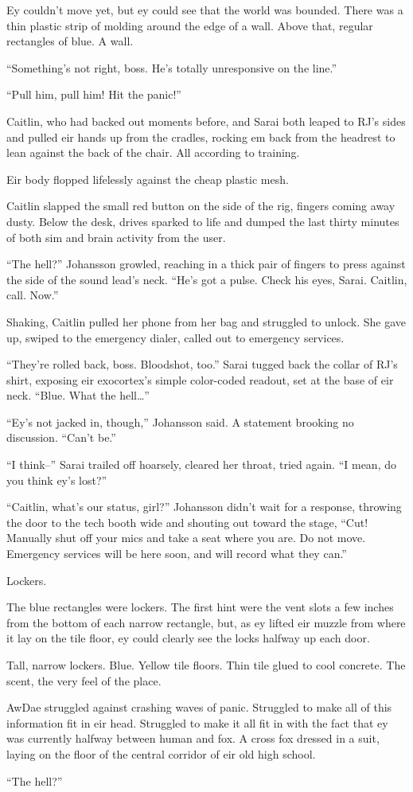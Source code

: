 Ey couldn't move yet, but ey could see that the world was bounded. There was a thin plastic strip of molding around the edge of a wall. Above that, regular rectangles of blue. A wall.

``Something's not right, boss. He's totally unresponsive on the line.''

``Pull him, pull him! Hit the panic!''

Caitlin, who had backed out moments before, and Sarai both leaped to RJ's sides and pulled eir hands up from the cradles, rocking em back from the headrest to lean against the back of the chair. All according to training.

Eir body flopped lifelessly against the cheap plastic mesh.

Caitlin slapped the small red button on the side of the rig, fingers coming away dusty. Below the desk, drives sparked to life and dumped the last thirty minutes of both sim and brain activity from the user.

``The hell?'' Johansson growled, reaching in a thick pair of fingers to press against the side of the sound lead's neck. ``He's got a pulse. Check his eyes, Sarai. Caitlin, call. Now.''

Shaking, Caitlin pulled her phone from her bag and struggled to unlock. She gave up, swiped to the emergency dialer, called out to emergency services.

``They're rolled back, boss. Bloodshot, too.'' Sarai tugged back the collar of RJ's shirt, exposing eir exocortex's simple color-coded readout, set at the base of eir neck. ``Blue. What the hell\ldots{}''

``Ey's not jacked in, though,'' Johansson said. A statement brooking no discussion. ``Can't be.''

``I think--'' Sarai trailed off hoarsely, cleared her throat, tried again. ``I mean, do you think ey's lost?''

``Caitlin, what's our status, girl?'' Johansson didn't wait for a response, throwing the door to the tech booth wide and shouting out toward the stage, ``Cut! Manually shut off your mics and take a seat where you are. Do not move. Emergency services will be here soon, and will record what they can.''

Lockers.

The blue rectangles were lockers. The first hint were the vent slots a few inches from the bottom of each narrow rectangle, but, as ey lifted eir muzzle from where it lay on the tile floor, ey could clearly see the locks halfway up each door.

Tall, narrow lockers. Blue. Yellow tile floors. Thin tile glued to cool concrete. The scent, the very feel of the place.

AwDae struggled against crashing waves of panic. Struggled to make all of this information fit in eir head. Struggled to make it all fit in with the fact that ey was currently halfway between human and fox. A cross fox dressed in a suit, laying on the floor of the central corridor of eir old high school.

``The hell?''
